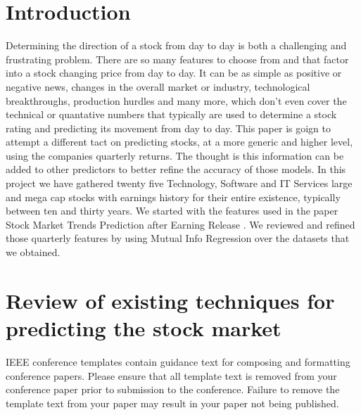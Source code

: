 \documentclass[conference]{IEEEtran}
\begin{document}
\section{Introduction}
Determining the direction of a stock from day to day is both a challenging and frustrating problem.  There are so many features to choose from and that factor into a stock changing price from day to day. It can be as simple as positive or negative news, changes in the overall market or industry, technological breakthroughs, production hurdles and many more, which don't even cover the technical or quantative numbers that typically are used to determine a stock rating and predicting its movement from day to day.  This paper is goign to attempt a different tact on predicting stocks, at a more generic and higher level, using the companies quarterly returns.  The thought is this information can be added to other predictors to better refine the accuracy of those models.  In this project we have gathered twenty five Technology, Software and IT Services large and mega cap stocks with earnings history for their entire existence, typically between ten and thirty years.  We started with the features used in the paper Stock Market Trends Prediction after Earning Release  \cite{QuarterlyPrediction}.  We reviewed and refined those quarterly features by using Mutual Info Regression over the datasets that we obtained.

\section{Review of existing techniques for predicting the stock market}

\cite{QuarterlyPrediction}





\vspace{12pt}
\color{red}
IEEE conference templates contain guidance text for composing and formatting conference papers. Please ensure that all template text is removed from your conference paper prior to submission to the conference. Failure to remove the template text from your paper may result in your paper not being published.
\end{document}
